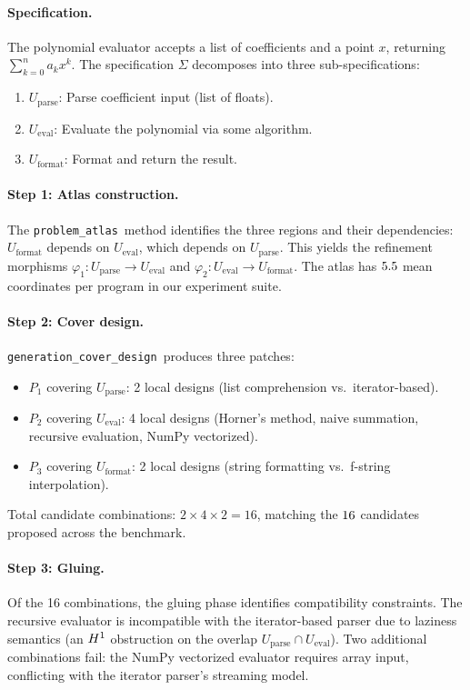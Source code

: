 \documentclass[11pt]{article}
\newcommand{\GenCover}{\texttt{generation\_cover\_design}}
\newcommand{\ProbAtlas}{\texttt{problem\_atlas}}
\begin{document}
\paragraph{Specification.}
The polynomial evaluator accepts a list of coefficients and a point
$x$, returning $\sum_{k=0}^{n} a_k x^k$.  The specification $\Sigma$
decomposes into three sub-specifications:
\begin{enumerate}[noitemsep]
  \item $U_{\text{parse}}$: Parse coefficient input (list of floats).
  \item $U_{\text{eval}}$: Evaluate the polynomial via some algorithm.
  \item $U_{\text{format}}$: Format and return the result.
\end{enumerate}

\paragraph{Step 1: Atlas construction.}
The \ProbAtlas\ method identifies the three regions and their
dependencies: $U_{\text{format}}$ depends on $U_{\text{eval}}$,
which depends on $U_{\text{parse}}$.  This yields the refinement
morphisms $\varphi_1\colon U_{\text{parse}} \to U_{\text{eval}}$
and $\varphi_2\colon U_{\text{eval}} \to U_{\text{format}}$.  The
atlas has $5.5$ mean coordinates per program in our
experiment suite.

\paragraph{Step 2: Cover design.}
\GenCover\ produces three patches:
\begin{itemize}[noitemsep]
  \item $P_1$ covering $U_{\text{parse}}$: 2 local designs
        (list comprehension vs.\ iterator-based).
  \item $P_2$ covering $U_{\text{eval}}$: 4 local designs
        (Horner's method, naive summation, recursive evaluation,
         NumPy vectorized).
  \item $P_3$ covering $U_{\text{format}}$: 2 local designs
        (string formatting vs.\ f-string interpolation).
\end{itemize}
Total candidate combinations: $2 \times 4 \times 2 = 16$, matching
the $16$ candidates proposed across the
benchmark.

\paragraph{Step 3: Gluing.}
Of the 16 combinations, the gluing phase identifies compatibility
constraints.  The recursive evaluator is incompatible with the
iterator-based parser due to laziness semantics (an $H^{1}$
obstruction on the overlap $U_{\text{parse}} \cap U_{\text{eval}}$).
Two additional combinations fail: the NumPy vectorized evaluator
requires array input, conflicting with the iterator parser's
streaming model.
\end{document}
